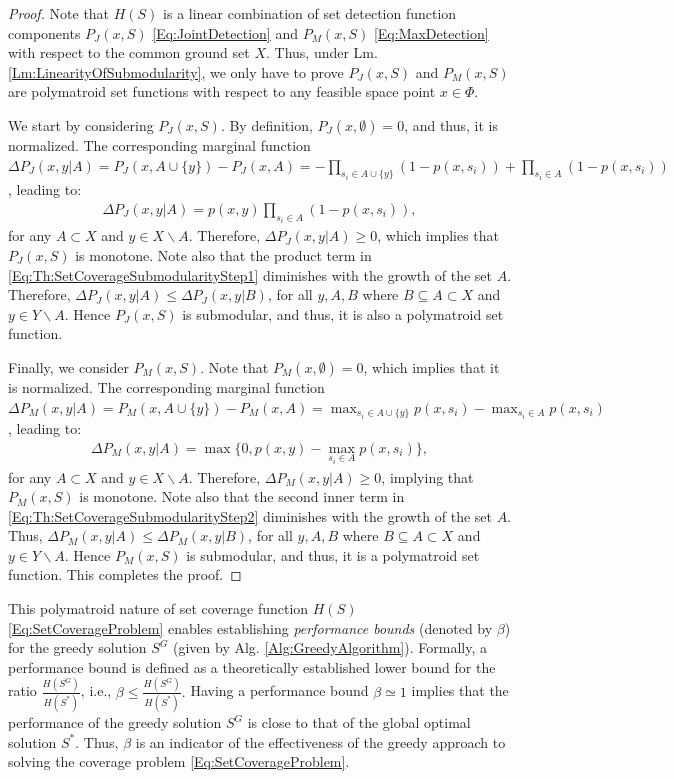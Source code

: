 \documentclass[letterpaper, 10 pt, conference]{ieeeconf}
\begin{document}
\begin{proof}
Note that $H(S)$ is a linear combination of set detection function components $P_J(x,S)$ \eqref{Eq:JointDetection} and $P_M(x,S)$ \eqref{Eq:MaxDetection} with respect to the common ground set $X$. Thus, under Lm. \ref{Lm:LinearityOfSubmodularity}, we only have to prove $P_J(x,S)$ and $P_M(x,S)$ are polymatroid set functions with respect to any feasible space point $x\in\Phi$. 

We start by considering $P_J(x,S)$. By definition, $P_J(x,\emptyset) = 0$, and thus, it is normalized. The corresponding marginal function $\Delta P_J(x,y \vert A) = P_J(x,A\cup\{y\}) - P_J(x,A) =  -\prod_{s_i\in A\cup\{y\}}(1-p(x,s_i)) +\prod_{s_i\in A}(1-p(x,s_i))$, leading to:
\begin{align}
\Delta P_J(x,y \vert A)  = p(x,y)\prod_{s_i\in A}(1-p(x,s_i)), \label{Eq:Th:SetCoverageSubmodularityStep1}
\end{align}
for any $A \subset X$ and $y\in X\backslash A$. Therefore, $\Delta P_J(x,y \vert A) \geq 0$, which implies that $P_J(x,S)$ is monotone. Note also that the product term in \eqref{Eq:Th:SetCoverageSubmodularityStep1} diminishes with the growth of the set $A$. Therefore, $\Delta P_J(x,y \vert A) \leq \Delta P_J(x,y \vert B)$, for all $y,A,B$ where $B\subseteq A \subset X$ and $y\in Y\backslash A$. Hence $P_J(x,S)$ is submodular, and thus, it is also a polymatroid set function.

Finally, we consider $P_M(x,S)$. Note that $P_M(x,\emptyset) = 0$, which implies that it is normalized. The corresponding marginal function 
$\Delta P_M(x,y \vert A) = P_M(x,A\cup\{y\}) - P_M(x,A) = \max_{s_i\in A\cup\{y\}} p(x,s_i) - \max_{s_i\in A} p(x,s_i)$, leading to:
\begin{align}
\Delta P_M(x,y \vert A) = \max\{0,p(x,y)-\max_{s_i\in A} p(x,s_i)\}, \label{Eq:Th:SetCoverageSubmodularityStep2}
\end{align}
for any $A \subset X$ and $y\in X\backslash A$. Therefore, $\Delta P_M(x,y \vert A) \geq 0$, implying that $P_M(x,S)$ is monotone. Note also that the second inner term in \eqref{Eq:Th:SetCoverageSubmodularityStep2} diminishes with the growth of the set $A$. Thus, $\Delta P_M(x,y \vert A) \leq \Delta P_M(x,y \vert B)$, for all $y,A,B$ where $B \subseteq A \subset X$ and $y \in Y\backslash A$. Hence $P_M(x,S)$ is submodular, and thus, it is a polymatroid set function. This completes the proof.
\end{proof}

This polymatroid nature of set coverage function $H(S)$ \eqref{Eq:SetCoverageProblem} enables establishing \emph{performance bounds} (denoted by $\beta$) for the greedy solution $S^G$ (given by Alg. \ref{Alg:GreedyAlgorithm}). Formally, a performance bound is defined as a theoretically established lower bound for the ratio $\frac{H(S^G)}{H(S^*)}$, i.e., 
$\beta \leq \frac{H(S^G)}{H(S^*)}.$
Having a performance bound $\beta \simeq 1$ implies that the performance of the greedy solution $S^G$ is close to that of the global optimal solution $S^*$. Thus, $\beta$ is an indicator of the effectiveness of the greedy approach to solving the coverage problem \eqref{Eq:SetCoverageProblem}.   
\end{document}
